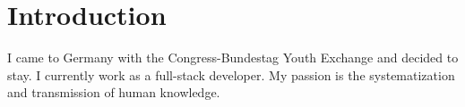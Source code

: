 
\section{Introduction}

{ I came to Germany with the Congress-Bundestag Youth Exchange and decided to stay. I currently work as a full-stack developer. My passion is the systematization and transmission of human knowledge. }